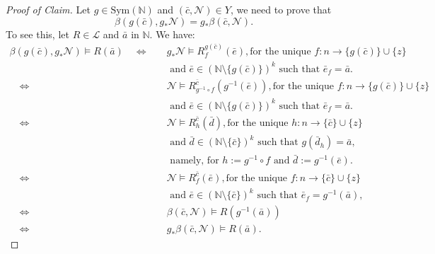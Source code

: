 \documentclass[10pt,a4paper]{amsart}
\newcommand{\N}{\mathbb{N}}
\begin{document}
\begin{proof}[Proof of Claim]
Let $g\in \mathrm{Sym}(\N)$ and $(\bar{c},\mathcal{N})\in Y$, we need to prove that
\[\beta(g (\bar{c}), g_{*}\mathcal{N})= g_* \beta(\bar{c},\mathcal{N}).\]  
To see this, let $R\in \mathcal L$ and  $\bar{a}$ in $\mathbb{N}$. We have:
\begin{align*}
      \beta(g (\bar{c}), g_{*}\mathcal{N}) \models R(\bar{a}) \quad \Leftrightarrow \quad &      {g_{*}\mathcal{N}} \models R^{g(\bar{c})}_{f}(\bar{e}), \text{for the unique }f\colon n\to \{g(\bar{c})\}\cup \{z\}\\ & \text{ and  }
      \bar{e}\in (\N \setminus \{g  (\bar{c})\})^k\text{ such that }\bar{e}_f=\bar{a}.\\
 \quad \Leftrightarrow \quad &      {\mathcal{N}} \models R^{\bar{c}}_{g^{-1}\circ f}(g^{-1}(\bar{e})), \text{for the unique }f\colon n\to \{g(\bar{c})\}\cup \{z\}\\ & \text{ and  }
      \bar{e}\in (\N \setminus \{g  (\bar{c})\})^k\text{ such that }\bar{e}_f=\bar{a}.\\
 \quad \Leftrightarrow \quad &      {\mathcal{N}}\models R^{\bar{c}}_{h}(\bar{d}), \text{for the unique }h\colon n\to \{\bar{c}\}\cup \{z\}\\ & \text{ and  }
      \bar{d}\in (\N \setminus \{\bar{c}\})^k\text{ such that }g(\bar{d}_h)=\bar{a}, \\
      & \text{ namely,  for } h:=g^{-1}\circ f \text{ and } \bar{d}:=g^{-1}(\bar{e}). \\ 
 \quad \Leftrightarrow \quad &      {\mathcal{N}}\models R^{\bar{c}}_{f}(\bar{e}), \text{for the unique } f \colon n\to \{\bar{c}\}\cup \{z\}\\ & \text{ and  }
      \bar{e}\in (\N \setminus \{\bar{c}\})^k\text{ such that } \bar{e}_f=g^{-1}(\bar{a}), \\
   \quad \Leftrightarrow \quad &  \beta(\bar{c},\mathcal{N}) \models R(g^{-1}(\bar{a}))\\
  \quad \Leftrightarrow \quad &   {g_* \beta(\bar{c},\mathcal{N})}\models R(\bar{a}).
\end{align*}
\end{proof}
\end{document}
